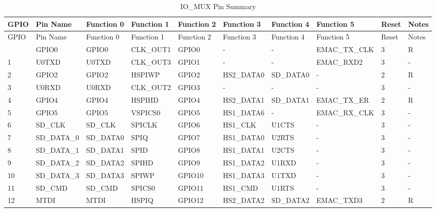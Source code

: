 \fontsize{8}{9}\selectfont
   \begin{longtable}[c]{|p{0.55cm}|p{1.8cm}|p{1.4cm}|p{1.4cm}|p{1.4cm}|p{1.6cm}|p{1.4cm}|p{2.0cm}|p{0.55cm}|p{0.55cm}| }
   \caption{IO\_MUX Pin Summary}
    \label{table:iomux_pads}
        \\\hline
        \rowcolor{lightgray}
GPIO & Pin Name & Function 0 & Function 1 & Function 2 & Function 3 & Function 4 & Function 5 & Reset & Notes \\
 \hline
        \endfirsthead
        \hline
        \rowcolor{lightgray}
        GPIO & Pin Name & Function 0 & Function 1 & Function 2 & Function 3 & Function 4 & Function 5 & Reset & Notes \\
        \hline
        \endhead
        \endfoot
0 & GPIO0    & GPIO0    & CLK\_OUT1 & GPIO0    & -        & -        & EMAC\_TX\_CLK & 3 & R \\
\hline
1 & U0TXD    & U0TXD    & CLK\_OUT3 & GPIO1    & -        & -        & EMAC\_RXD2 & 3 & - \\
\hline
2 & GPIO2    & GPIO2    & HSPIWP   & GPIO2    & HS2\_DATA0 & SD\_DATA0 & -        & 2 & R \\
\hline
3 & U0RXD    & U0RXD    & CLK\_OUT2 & GPIO3    & -        & -        & -        & 3 & - \\
\hline
4 & GPIO4    & GPIO4    & HSPIHD   & GPIO4    & HS2\_DATA1 & SD\_DATA1 & EMAC\_TX\_ER & 2 & R \\
\hline
5 & GPIO5    & GPIO5    & VSPICS0  & GPIO5    & HS1\_DATA6 & -        & EMAC\_RX\_CLK & 3 & - \\
\hline
6 & SD\_CLK  & SD\_CLK  & SPICLK   & GPIO6    & HS1\_CLK & U1CTS    & -        & 3 & - \\
\hline
7 & SD\_DATA\_0 & SD\_DATA0 & SPIQ     & GPIO7    & HS1\_DATA0 & U2RTS    & -        & 3 & - \\
\hline
8 & SD\_DATA\_1 & SD\_DATA1 & SPID     & GPIO8    & HS1\_DATA1 & U2CTS    & -        & 3 & - \\
\hline
9 & SD\_DATA\_2 & SD\_DATA2 & SPIHD    & GPIO9    & HS1\_DATA2 & U1RXD    & -        & 3 & - \\
\hline
10 & SD\_DATA\_3 & SD\_DATA3 & SPIWP    & GPIO10   & HS1\_DATA3 & U1TXD    & -        & 3 & - \\
\hline
11 & SD\_CMD  & SD\_CMD  & SPICS0   & GPIO11   & HS1\_CMD & U1RTS    & -        & 3 & - \\
\hline
12 & MTDI     & MTDI     & HSPIQ    & GPIO12   & HS2\_DATA2 & SD\_DATA2 & EMAC\_TXD3 & 2 & R \\

\end{longtable}
